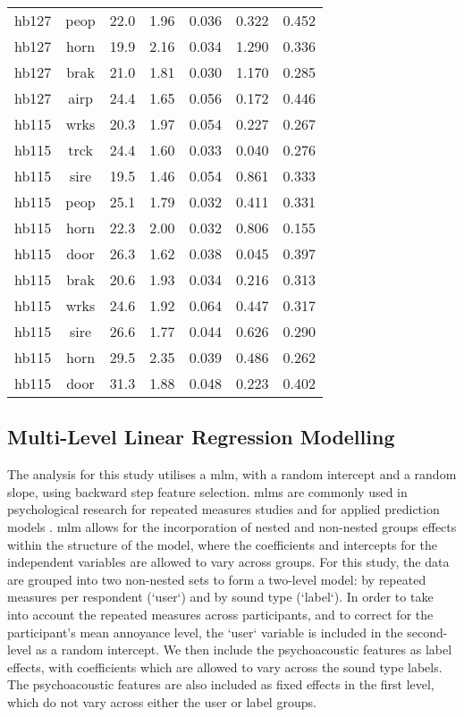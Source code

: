 \begin{table}
{\begin{tabular}{ccccccc}
hb127 & peop & 22.0 & 1.96 & 0.036 & 0.322 & 0.452 \\
hb127 & horn & 19.9 & 2.16 & 0.034 & 1.290 & 0.336 \\
hb127 & brak & 21.0 & 1.81 & 0.030 & 1.170 & 0.285 \\
hb127 & airp & 24.4 & 1.65 & 0.056 & 0.172 & 0.446 \\ 
\hline
hb115 & wrks & 20.3 & 1.97 & 0.054 & 0.227 & 0.267 \\
hb115 & trck & 24.4 & 1.60 & 0.033 & 0.040 & 0.276 \\
hb115 & sire & 19.5 & 1.46 & 0.054 & 0.861 & 0.333 \\
hb115 & peop & 25.1 & 1.79 & 0.032 & 0.411 & 0.331 \\
hb115 & horn & 22.3 & 2.00 & 0.032 & 0.806 & 0.155 \\
hb115 & door & 26.3 & 1.62 & 0.038 & 0.045 & 0.397 \\
hb115 & brak & 20.6 & 1.93 & 0.034 & 0.216 & 0.313 \\ 
\hline
hb115 & wrks & 24.6 & 1.92 & 0.064 & 0.447 & 0.317 \\
hb115 & sire & 26.6 & 1.77 & 0.044 & 0.626 & 0.290 \\
hb115 & horn & 29.5 & 2.35 & 0.039 & 0.486 & 0.262 \\
hb115 & door & 31.3 & 1.88 & 0.048 & 0.223 & 0.402 \\
\bottomrule
\end{tabular}
}
\end{table}

\subsection{Multi-Level Linear Regression Modelling}

The analysis for this study utilises a \gls{mlm}, with a random intercept and a random slope, using backward step feature selection. \glspl{mlm} are commonly used in psychological research for repeated measures studies  and for applied prediction models . \gls{mlm} allows for the incorporation of nested and non-nested groups effects within the structure of the model, where the coefficients and intercepts for the independent variables are allowed to vary across groups. For this study, the data are grouped into two non-nested sets to form a two-level model: by repeated measures per respondent (`user`) and by sound type (`label`). In order to take into account the repeated measures across participants, and to correct for the participant's mean annoyance level, the `user` variable is included in the second-level as a random intercept. We then include the psychoacoustic features as label effects, with coefficients which are allowed to vary across the sound type labels. The psychoacoustic features are also included as fixed effects in the first level, which do not vary across either the user or label groups.


